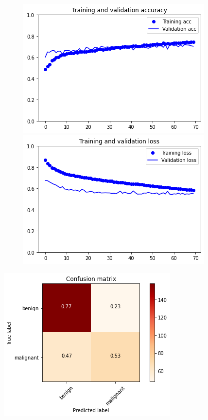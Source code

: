 \documentclass{article}
\begin{document}
\begin{figure}[h]
    \centering
    \begin{minipage}{0.45\textwidth}
        \centering
        \includegraphics[scale=0.46]{./img/preTrainValVGG16_ft_3_2.png}
    \end{minipage}\hfill
    \begin{minipage}{0.45\textwidth}
        \centering
        \includegraphics[scale=0.46]{./img/preTrainLossVGG16_ft_3_2.png}
    \end{minipage}
\end{figure}


\begin{center}
\begin{minipage}{0.45\textwidth}
        \includegraphics[scale=0.6]{./img/cmPreTrainVGG16_ft_3_2.png}
    \end{minipage}
\end{center}
\end{document}
